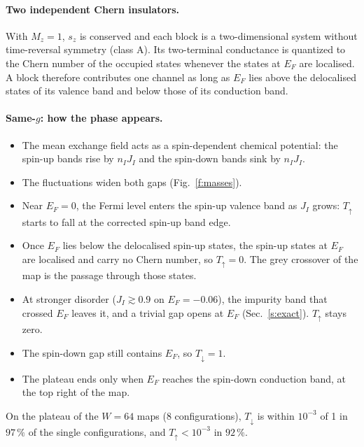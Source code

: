 \documentclass[11pt,a4paper]{article}
\newcommand{\up}{{\uparrow}}
\newcommand{\dn}{{\downarrow}}
\begin{document}
\paragraph{Two independent Chern insulators.} With $M_z=1$, $s_z$ is conserved and each block is a
two-dimensional system without time-reversal symmetry (class A). Its two-terminal conductance is
quantized to the Chern number of the occupied states whenever the states at $E_F$ are
localised. A block therefore contributes one channel as long as $E_F$ lies above the delocalised
states of its valence band and below those of its conduction band.

\paragraph{Same-$g$: how the phase appears.}
\begin{itemize}
\item The mean exchange field acts as a spin-dependent chemical potential: the spin-up bands
  rise by $n_I J_I$ and the spin-down bands sink by $n_I J_I$.
\item The fluctuations widen both gaps (Fig.~\ref{f:masses}).
\item Near $E_F=0$, the Fermi level enters the spin-up valence band as $J_I$ grows: $T_\up$ starts
  to fall at the corrected spin-up band edge.
\item Once $E_F$ lies below the delocalised spin-up states, the spin-up states at $E_F$ are
  localised and carry no Chern number, so $T_\up=0$. The grey crossover of the map is the
  passage through those states.
\item At stronger disorder ($J_I\gtrsim0.9$ on $E_F=-0.06$), the impurity band that crossed $E_F$
  leaves it, and a trivial gap opens at $E_F$ (Sec.~\ref{s:exact}). $T_\up$ stays zero.
\item The spin-down gap still contains $E_F$, so $T_\dn=1$.
\item The plateau ends only when $E_F$ reaches the spin-down conduction band, at the top right
  of the map.
\end{itemize}
On the plateau of the $W=64$ maps (8 configurations), $T_\dn$ is within $10^{-3}$ of 1 in $97\,\%$
of the single configurations, and $T_\up<10^{-3}$ in $92\,\%$.
\end{document}
